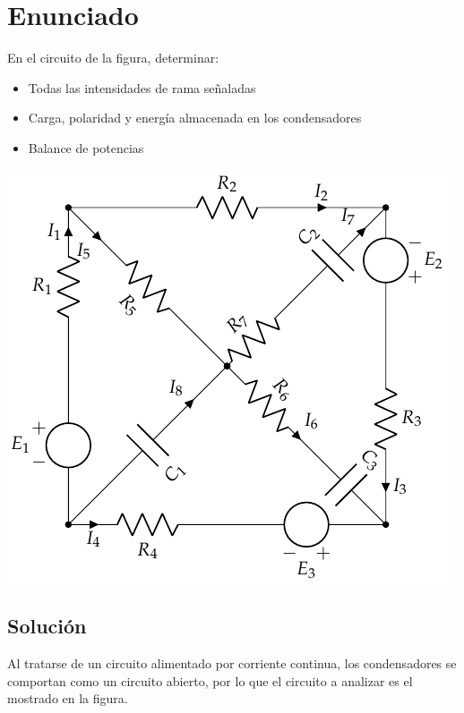 \section{Enunciado}
En el circuito de la figura, determinar:
\begin{itemize}
\item Todas las intensidades de rama señaladas
\item Carga, polaridad y energía almacenada en los condensadores
\item Balance de potencias
\end{itemize}

\begin{center}
  \includegraphics{figuras/BT1_09.pdf}
\end{center}

\subsection*{Solución}
Al tratarse de un circuito alimentado por corriente continua, los
condensadores se comportan como un circuito abierto, por lo que el
circuito a analizar es el mostrado en la figura.


